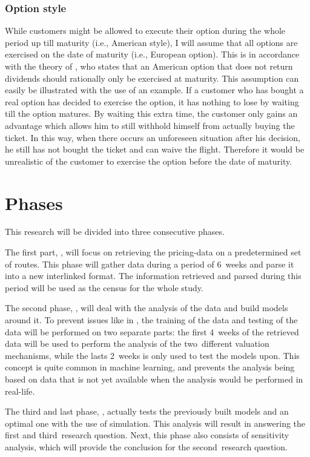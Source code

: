\subsubsection{Option style}
While customers might be allowed to execute their option during the whole period up till maturity (i.e., American style), I will assume that all options are exercised on the date of maturity (i.e., European option). This is in accordance with the theory of , who states that an American option that does not return dividends should rationally only be exercised at maturity. This assumption can easily be illustrated with the use of an example. If a customer who has bought a real option has decided to exercise the option, it has nothing to lose by waiting till the option matures. By waiting this extra time, the customer only gains an advantage which allows him to still withhold himself from actually buying the ticket. In this way, when there occurs an unforeseen situation after his decision, he still has not bought the ticket and can waive the flight. Therefore it would be unrealistic of the customer to exercise the option before the date of maturity.



\section{Phases}
This research will be divided into three consecutive phases.

The first part, , will focus on retrieving the pricing-data on a predetermined set of routes. This phase will gather data during a period of 6~weeks and parse it into a new interlinked format. The information retrieved and parsed during this period will be used as the census for the whole study.

The second phase, , will deal with the analysis of the data and build models around it. To prevent issues like in , the training of the data and testing of the data will be performed on two separate parts: the first 4~weeks of the retrieved data will be used to perform the analysis of the two~different valuation mechanisms, while the lasts 2~weeks is only used to test the models upon. This concept is quite common in machine learning, and prevents the analysis being based on data that is not yet available when the analysis would be performed in real-life.

The third and last phase, , actually tests the previously built models and an optimal one with the use of simulation. This analysis will result in answering the first and third~research question. Next, this phase also consists of sensitivity analysis, which will provide the conclusion for the second~research question.

